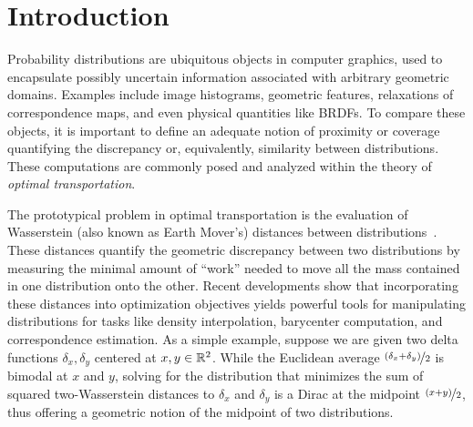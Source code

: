 
\section{Introduction}

Probability distributions are ubiquitous objects in computer graphics, used to encapsulate possibly uncertain information associated with arbitrary geometric domains. Examples include image histograms, geometric features, relaxations of correspondence maps, and even physical quantities like BRDFs.
To compare these objects, it is important to define an adequate notion of proximity or coverage quantifying the discrepancy or, equivalently, similarity between distributions. These computations are commonly posed and analyzed within the theory of \emph{optimal transportation}.

The prototypical problem in optimal transportation is the evaluation of Wasserstein (also known as Earth Mover's) distances between distributions~\cite{villani-2003,rubner-2000}. These distances quantify the geometric discrepancy between two distributions %
by measuring the minimal amount of ``work'' needed to move all the mass contained in one distribution onto the other.
Recent developments show that incorporating these distances into optimization objectives yields powerful tools for manipulating distributions for tasks like density interpolation, barycenter computation, and correspondence estimation. As a simple example, suppose we are given two delta functions $\delta_x,\delta_y$ centered at $x,y \in \mathbb{R}^2$. While the Euclidean average $\nicefrac{(\delta_x+\delta_y)}{2}$ is bimodal at $x$ and $y$, solving for the distribution that minimizes the sum of squared two-Wasserstein distances to $\delta_x$ and $\delta_y$ is a Dirac at the midpoint $\nicefrac{(x+y)}{2}$, thus offering a geometric notion of the midpoint of two distributions.


